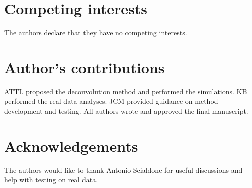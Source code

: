 \documentclass{bmcart}
\begin{document}
\begin{backmatter}

\section*{Competing interests}
The authors declare that they have no competing interests.

\section*{Author's contributions}
ATTL proposed the deconvolution method and performed the simulations.
KB performed the real data analyses.
JCM provided guidance on method development and testing.
All authors wrote and approved the final manuscript.

\section*{Acknowledgements}
The authors would like to thank Antonio Scialdone for useful discussions and help with testing on real data.





\end{backmatter}
\end{document}
